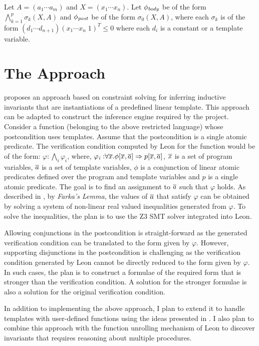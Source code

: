 \documentclass[a4paper,10pt]{article}
\begin{document}
Let $A = (a_1 \cdots a_m)$ and $X = (x_1 \cdots x_n)$.
Let $\mathit{\phi_{body}}$ be of the form $\bigwedge \limits_{k=1}^{p} \sigma_k(X,A)$ and  
$\mathit{\phi_{post}}$ be of the form $\sigma_0(X,A)$, where each $\sigma_k$ is of the form 
$(d_1 \cdots d_{n+1}) (x_1 \cdots x_n \; 1)^T \le 0$ where each $d_i$ is a 
constant or a template variable.





\section{The Approach}

\cite{ssriram:CAV03,ssriram:SAS04} proposes an approach based on constraint solving for inferring  inductive invariants that are instantiations of a predefined linear template. This approach can be adapted to construct the inference engine required by the project. Consider a function (belonging to the above restricted language) whose postcondition uses templates. Assume that the postcondition is a single atomic predicate. The verification condition computed by Leon for the function would be of the form: $\varphi: \bigwedge_i \varphi_i$, where,
$\mathit{\varphi_i: } \forall \overline{x}. \phi[\overline{x},\overline{a}] \Rightarrow p[\overline{x},\overline{a}]$, $\overline{x}$ is a set of program variables, $\overline{a}$ is a set of template variables, $\phi$ is a conjunction of linear atomic predicates defined over the program and template variables and $p$ is a single atomic predicate.
The goal is to find an assignment to $\overline{a}$ such that $\varphi$ holds.
As described in \cite{ssriram:CAV03}, by \textit{Farka's Lemma}, the values of $\overline{a}$ that satisfy $\varphi$ can be obtained by solving a system of non-linear real valued inequalities generated from $\varphi$. To solve the inequalities, the plan is to use the Z3 SMT solver integrated into Leon.

Allowing conjunctions in the postcondition is straight-forward as the generated  verification condition can be translated to the  form given by $\varphi$. However, supporting disjunctions in the postcondition is challenging as the verification condition generated by Leon cannot be directly reduced to the form given by $\varphi$. In such cases, the plan is to construct a formulae of the required form that is stronger than the verification condition. A solution for the stronger formulae is also a solution 
for the original verification condition.

In addition to implementing the above approach, I plan to extend it to handle templates with user-defined functions using the ideas presented in \cite{dirk:VMCAI07}. I also plan to combine this approach with the function unrolling mechanism of Leon to discover invariants that requires reasoning about multiple procedures.
 
\end{document}
